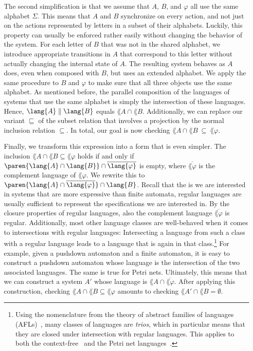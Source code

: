 \documentclass[../../diss.tex]{subfiles}
\begin{document}
The second simplification is that we assume that $A$, $B$, and $\varphi$ all use the same alphabet $\Sigma$.
This means that $A$ and $B$ synchronize on every action, and not just on the actions represented by letters in a subset of their alphabets.
Luckily, this property can usually be enforced rather easily without changing the behavior of the system.
For each letter of $B$ that was not in the shared alphabet, we introduce appropriate transitions in $A$ that correspond to this letter without actually changing the internal state of $A$.
The resulting system behaves as $A$ does, even when composed with $B$, but uses an extended alphabet.
We apply the same procedure to $B$ and $\varphi$ to make sure that all three objects use the same alphabet.
As mentioned before, the parallel composition of the languages of systems that use the same alphabet is simply the intersection of these languages.
Hence, $\lang{A} \parcomp \lang{B}$ equals $\lang{A} \cap \lang{B}$.
Additionally, we can replace our variant $\sqsubseteq$ of the subset relation that involves a projection by the normal inclusion relation $\subseteq$.
In total, our goal is now checking $\lang{A} \cap \lang{B} \ \subseteq \ \lang{\varphi}$.

Finally, we transform this expression into a form that is even simpler.
The inclusion $\lang{A} \cap \lang{B} \subseteq \lang{\varphi}$ holds if and only if $\paren{ \lang{A} \cap \lang{B} } \cap \overline{\lang{\varphi}}$ is empty, where $\overline{\lang{\varphi}}$ is the complement language of $\lang{\varphi}$.
We rewrite this to $\paren{ \lang{A} \cap \overline{\lang{\varphi}}} \cap \lang{B}$.
Recall that the  is  we are interested in systems that are more expressive than finite automata, regular languages are usually sufficient to represent the specifications we are interested in.
By the closure properties of regular languages, also the complement language $\overline{\lang{\varphi}}$ is regular.
Additionally, most other language classes are well-behaved when it comes to intersections with regular languages:
Intersecting a language from such a class with a regular language leads to a language that is again in that class.\footnote{%
    Using the nomenclature from the theory of abstract families of languages (AFLs)~\cite{Berstel79}, many classes of languages are \emph{trios}, which in particular means that they are closed under intersection with regular languages.
    This applies to both the context-free~\cite{Berstel79} and the Petri net languages~\cite{Jantzen87}.%
}
For example, given a pushdown automaton and a finite automaton, it is easy to construct a pushdown automaton whose language is the intersection of the two associated languages.
The same is true for Petri nets.
Ultimately, this means that we can construct a system $A'$ whose language is $\lang{A} \cap \overline{\lang{\varphi}}$.
After applying this construction, checking $\lang{A} \cap \lang{B} \subseteq \lang{\varphi}$ amounts to checking $\lang{A'} \cap \lang{B} = \emptyset$.
\end{document}
